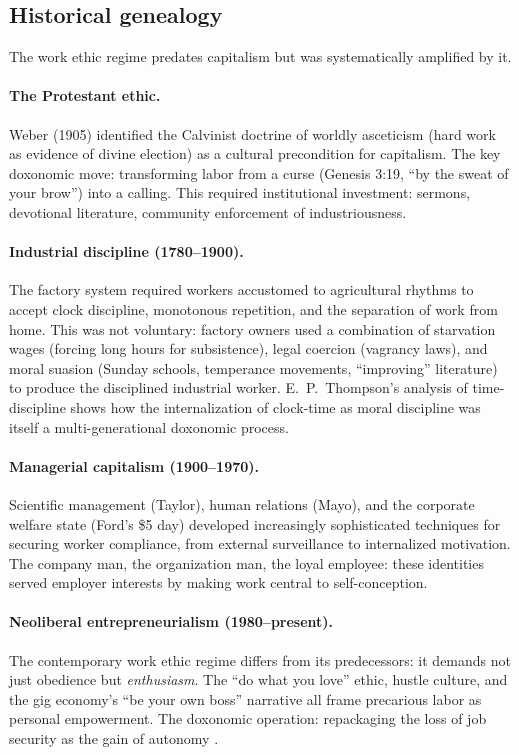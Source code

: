 \subsection{Historical genealogy}

The work ethic regime predates capitalism but was systematically amplified by it.

\paragraph{The Protestant ethic.}
Weber (1905) identified the Calvinist doctrine of worldly asceticism (hard work as evidence of divine election) as a cultural precondition for capitalism.
The key doxonomic move: transforming labor from a curse (Genesis 3:19, ``by the sweat of your brow'') into a calling.
This required institutional investment: sermons, devotional literature, community enforcement of industriousness.

\paragraph{Industrial discipline (1780--1900).}
The factory system required workers accustomed to agricultural rhythms to accept clock discipline, monotonous repetition, and the separation of work from home.
This was not voluntary: factory owners used a combination of starvation wages (forcing long hours for subsistence), legal coercion (vagrancy laws), and moral suasion (Sunday schools, temperance movements, ``improving'' literature) to produce the disciplined industrial worker.
E.\ P.\ Thompson's analysis of time-discipline shows how the internalization of clock-time as moral discipline was itself a multi-generational doxonomic process.

\paragraph{Managerial capitalism (1900--1970).}
Scientific management (Taylor), human relations (Mayo), and the corporate welfare state (Ford's \$5 day) developed increasingly sophisticated techniques for securing worker compliance, from external surveillance to internalized motivation.
The company man, the organization man, the loyal employee: these identities served employer interests by making work central to self-conception.

\paragraph{Neoliberal entrepreneurialism (1980--present).}
The contemporary work ethic regime differs from its predecessors: it demands not just obedience but \emph{enthusiasm}.
The ``do what you love'' ethic, hustle culture, and the gig economy's ``be your own boss'' narrative all frame precarious labor as personal empowerment.
The doxonomic operation: repackaging the loss of job security as the gain of autonomy \autocite{sennett1998}.

